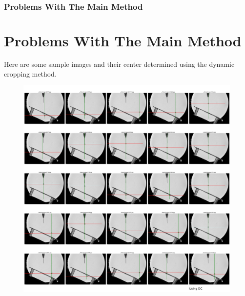 \documentclass{beamer}
\begin{document}
\begin{frame}
    \frametitle{Problems With The Main Method}
    \section{Problems With The Main Method}
    Here are some sample images and their center determined using the dynamic cropping method.\\
    \begin{figure}
        \centering
        \includegraphics[scale=0.10]{using_dc.png}
    \end{figure}
\end{frame}
\end{document}
